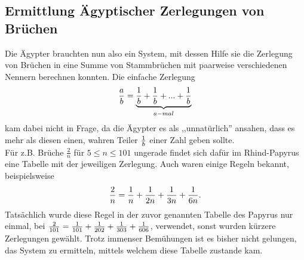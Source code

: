 \subsection{Ermittlung Ägyptischer Zerlegungen von Brüchen}
Die Ägypter brauchten nun also ein System, mit dessen Hilfe sie die Zerlegung von Brüchen in eine Summe von Stammbrüchen mit paarweise verschiedenen Nennern berechnen konnten. Die einfache Zerlegung
$$\frac{a}{b} = \underbrace{\frac{1}{b} + \frac{1}{b} + ... +\frac{1}{b}}_{a-mal}$$
kam dabei nicht in Frage, da die Ägypter es als ,,unnatürlich'' ansahen, dass es mehr als diesen einen, wahren Teiler $\frac{1}{b}$ einer Zahl geben sollte. \cite[S.39]{Burton2011}\\
Für z.B. Brüche $\frac{2}{n}$ für $5 \leq n \leq 101$ ungerade findet sich dafür im Rhind-Papyrus eine Tabelle mit der jeweiligen Zerlegung. Auch waren einige Regeln bekannt, beispielsweise
$$\frac{2}{n} = \frac{1}{n} + \frac{1}{2n} + \frac{1}{3n} +\frac{1}{6n}.$$
Tatsächlich wurde diese Regel in der zuvor genannten Tabelle des Papyrus nur einmal, bei $\frac{2}{101} = \frac{1}{101}+\frac{1}{202}+\frac{1}{303}+\frac{1}{606}$, verwendet, sonst wurden kürzere Zerlegungen gewählt. Trotz immenser Bemühungen ist es bisher nicht gelungen, das System zu ermitteln, mittels welchem diese Tabelle zustande kam. \cite[S. 41]{Burton2011}

